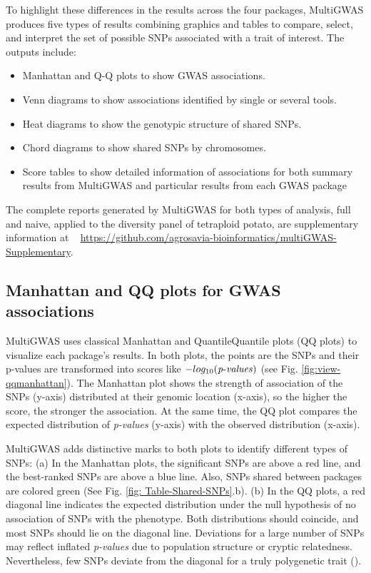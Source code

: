 \documentclass{article}
\begin{document}
To highlight these differences in the results across the four packages, MultiGWAS produces five types of results combining graphics and tables to compare, select, and interpret the set of possible SNPs associated with a trait of interest. The outputs include: 
\begin{itemize}
\item Manhattan and Q-Q plots to show GWAS associations. 
\item Venn diagrams to show associations identified by single or several tools.
\item Heat diagrams to show the genotypic structure of shared SNPs.
\item Chord diagrams to show shared SNPs by chromosomes.
\item Score tables to show detailed information of associations for both summary results from MultiGWAS and particular results from each GWAS
package
\end{itemize}

The complete reports generated by MultiGWAS for both types of analysis, full and naive, applied to the diversity panel of tetraploid potato, are supplementary information at ~ \url{https://github.com/agrosavia-bioinformatics/multiGWAS-Supplementary}.



\subsection{Manhattan and QQ plots for GWAS associations }

MultiGWAS uses classical Manhattan and Quantile\textendash Quantile plots (QQ plots) to visualize each package's results. In both plots, the points are the SNPs and their p-values are transformed into scores like $-log_{10}({\operatorname{\mathit{p-values}}})$ (see Fig. \ref{fig:view-qqmanhattan}). The Manhattan plot shows the strength of association of the SNPs (y-axis) distributed at their genomic location (x-axis), so the higher the score, the stronger the association. At the same time, the QQ plot compares the expected distribution of \emph{p-values} (y-axis) with the observed distribution (x-axis).

MultiGWAS adds distinctive marks to both plots to identify different types of SNPs: (a) In the Manhattan plots, the significant SNPs are above a red line, and the best-ranked SNPs are above a blue line. Also, SNPs shared between packages are colored green (See Fig. \ref{fig: Table-Shared-SNPs}.b). (b) In the QQ plots, a red diagonal line indicates the expected distribution under the null hypothesis of no association of SNPs with the phenotype. Both distributions should coincide, and most SNPs should lie on the diagonal line. Deviations for a large number of SNPs may reflect inflated {\emph{p-values }}due to population structure or cryptic relatedness. Nevertheless, few SNPs deviate from the diagonal for a truly polygenetic trait (\cite{Power2016}).
\end{document}
